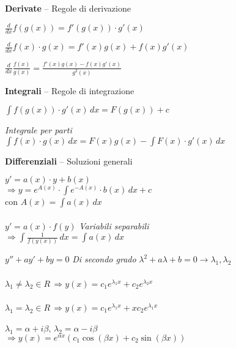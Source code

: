 \documentclass[10pt]{article}
\begin{document}
\begin{multicols}{2}
\textbf{Derivate} -- Regole di derivazione
\begin{center}
	\begin{list}{}{}
		\item $\frac{d}{dx} f(g(x)) = f'(g(x)) \cdot g'(x)$
		\item $\frac{d}{dx} f(x) \cdot g(x) = f'(x)g(x) + f(x)g'(x)$
		\item $\frac{d}{dx} \frac{f(x)}{g(x)} = \frac{f'(x)g(x) - f(x)g'(x)}{g^2(x)}$
	\end{list}
\end{center}
\columnbreak
\textbf{Integrali} -- Regole di integrazione
\begin{center}
	\begin{list}{}{}
		\item $\int f(g(x))\cdot g'(x)\,dx = F(g(x)) + c$
		\item \textit{Integrale per parti}\\$\int f(x)\cdot g(x)\,dx = F(x)g(x) - \int F(x)\cdot g'(x)\,dx$
	\end{list}
\end{center}
\end{multicols}
\textbf{Differenziali} -- Soluzioni generali
\begin{multicols}{2}
	$y' = a(x)\cdot y + b(x)$\\
	$\Rightarrow y = e^{A(x)}\cdot \int e^{-A(x)}\cdot b(x)\,dx + c$\\
	con $A(x) = \int a(x)\,dx$\\\\

	$y' = a(x)\cdot f(y)$ \textit{Variabili separabili}\\
	$\Rightarrow \int \frac{1}{f(y(x))}\,dx = \int a(x)\,dx$\\
	\columnbreak
	
	$y'' + ay' + by = 0$ \textit{Di secondo grado}
	$\lambda^2 + a\lambda + b = 0 \rightarrow \lambda_1,\lambda_2$\\\\
	$\lambda_1 \neq \lambda_2 \in R$\,$\Rightarrow y(x) = c_1e^{\lambda_1x} + c_2e^{\lambda_2x}$\\\\
	$\lambda_1 = \lambda_2 \in R$\,$\Rightarrow y(x) = c_1e^{\lambda_1x} + xc_2e^{\lambda_1x}$\\\\
	$\lambda_1 = \alpha + i\beta,\, \lambda_2 = \alpha - i\beta$\\$\Rightarrow y(x) = e^{\alpha x}(c_1\cos(\beta x) + c_2\sin(\beta x))$
\end{multicols}
\end{document}
